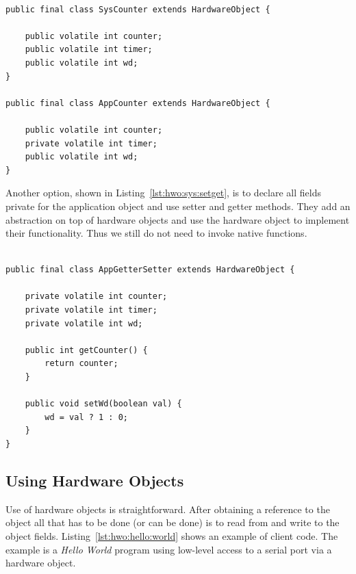 \begin{lstlisting}[float,caption={System and application classes
with visibility protection for a single hardware device},
label=lst:hwo:sys:classes]

public final class SysCounter extends HardwareObject {

    public volatile int counter;
    public volatile int timer;
    public volatile int wd;
}

public final class AppCounter extends HardwareObject {

    public volatile int counter;
    private volatile int timer;
    public volatile int wd;
}
\end{lstlisting}

Another option, shown in Listing~\ref{lst:hwo:sys:setget}, is to
declare all fields private for the application object and use setter
and getter methods. They add an abstraction on top of hardware
objects and use the hardware object to implement their functionality.
Thus we still do not need to invoke native functions.

\begin{lstlisting}[float,caption={System and application classes with setter and getter
methods}, label=lst:hwo:sys:setget]

public final class AppGetterSetter extends HardwareObject {

    private volatile int counter;
    private volatile int timer;
    private volatile int wd;

    public int getCounter() {
        return counter;
    }

    public void setWd(boolean val) {
        wd = val ? 1 : 0;
    }
}
\end{lstlisting}


\subsection{Using Hardware Objects}

Use of hardware objects is straightforward. After obtaining a
reference to the object all that has to be done (or can be done) is
to read from and write to the object fields.
Listing~\ref{lst:hwo:hello:world} shows an example of client code.
The example is a \emph{Hello World} program using low-level access to
a serial port via a hardware object.

